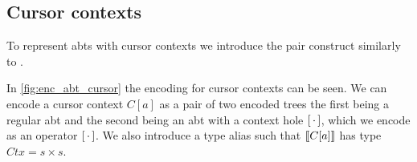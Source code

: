 \documentclass[sigplan,review]{acmart}
\newcommand{\abt}{\textsf{abt}\xspace}
\begin{document}
\subsection{Cursor contexts}\label{sec:enc_cursor_contexts}

To represent {\abt}s with cursor contexts we introduce the pair construct similarly to \cite{types_programming_languages}.


In \cref{fig:enc_abt_cursor} the encoding for cursor contexts can be seen. We can encode a cursor context $C[a]$ as a pair of two encoded trees the first being a regular \abt and the second being an \abt with a context hole $[ \, \cdot \, ]$, which we encode as an operator $[ \, \cdot \, ]$. We also introduce a type alias such that $\llbracket C[a] \rrbracket$ has type $Ctx = s \times s$.

    
\end{document}
